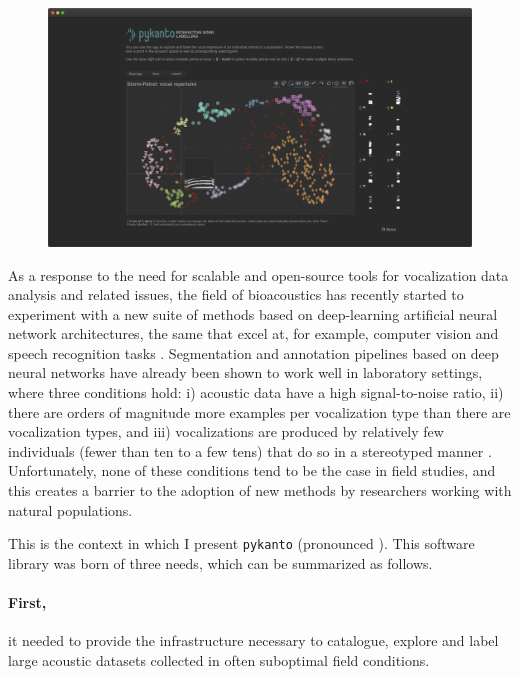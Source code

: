 \begin{figure}[t!]
    \centering
    \includegraphics[width=\linewidth]{figures/chapter_2/fig1.png}
    \label{fig:app}
\end{figure}

As a response to the need for scalable and open-source tools for vocalization
data analysis and related issues, the field of bioacoustics has recently started
to experiment with a new suite of methods based on deep-learning artificial
neural network architectures, the same that excel at, for example, computer
vision and speech recognition tasks \parencite{stowell2021}. Segmentation and
annotation pipelines based on deep neural networks have already been shown to
work well in laboratory settings, where three conditions hold: i) acoustic data
have a high signal-to-noise ratio, ii) there are orders of magnitude more
examples per vocalization type than there are vocalization types, and iii)
vocalizations are produced by relatively few individuals (fewer than ten to a
few tens) that do so in a stereotyped manner \parencite{coffey2019, cohen2022,
steinfath2021}. Unfortunately, none of these conditions tend to be the case in
field studies, and this creates a barrier to the adoption of new methods by
researchers working with natural populations.

This is the context in which I present \texttt{pykanto} (pronounced ). This software library was born of three needs, which can be summarized as follows.

\paragraph{First,} it needed to provide the infrastructure necessary to catalogue,
explore and label large acoustic datasets collected in often suboptimal field
conditions.

